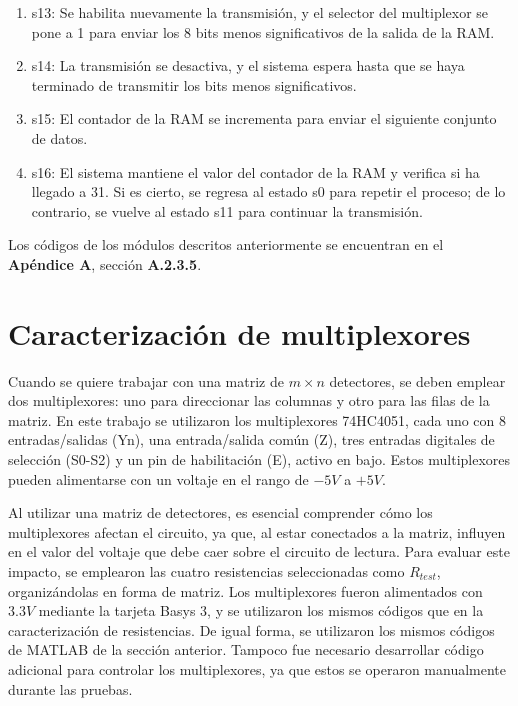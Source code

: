 \begin{itemize}
\begin{enumerate}
     \item s13: Se habilita nuevamente la transmisión, y el selector del multiplexor se pone a 1 para enviar los 8 bits menos significativos de la salida de la RAM.
     \item s14: La transmisión se desactiva, y el sistema espera hasta que se haya terminado de transmitir los bits menos significativos.
     \item s15: El contador de la RAM se incrementa para enviar el siguiente conjunto de datos.
     \item s16: El sistema mantiene el valor del contador de la RAM y verifica si ha llegado a 31. Si es cierto, se regresa al estado s0 para repetir el proceso; de lo contrario, se vuelve al estado s11 para continuar la transmisión.           
    \end{enumerate}
\end{itemize}

Los códigos de los módulos descritos anteriormente se encuentran en el \textbf{Apéndice A}, sección \textbf{A.2.3.5}.


\section{Caracterización de multiplexores}
Cuando se quiere trabajar con una matriz de $m \times n$ detectores, se deben emplear dos multiplexores: uno para direccionar las columnas y otro para las filas de la matriz. En este trabajo se utilizaron los multiplexores 74HC4051, cada uno con 8 entradas/salidas (Yn), una entrada/salida común (Z), tres entradas digitales de selección (S0-S2) y un pin de habilitación (E), activo en bajo. Estos multiplexores pueden alimentarse con un voltaje en el rango de $-5V$ a $+5V$.


Al utilizar una matriz de detectores, es esencial comprender cómo los multiplexores afectan el circuito, ya que, al estar conectados a la matriz, influyen en el valor del voltaje que debe caer sobre el circuito de lectura. Para evaluar este impacto, se emplearon las cuatro resistencias seleccionadas como $R_{test}$, organizándolas en forma de matriz. Los multiplexores fueron alimentados con $3.3V$ mediante la tarjeta Basys 3, y se utilizaron los mismos códigos que en la caracterización de resistencias. De igual forma, se utilizaron los mismos códigos de MATLAB de la sección anterior. Tampoco fue necesario desarrollar código adicional para controlar los multiplexores, ya que estos se operaron manualmente durante las pruebas.


